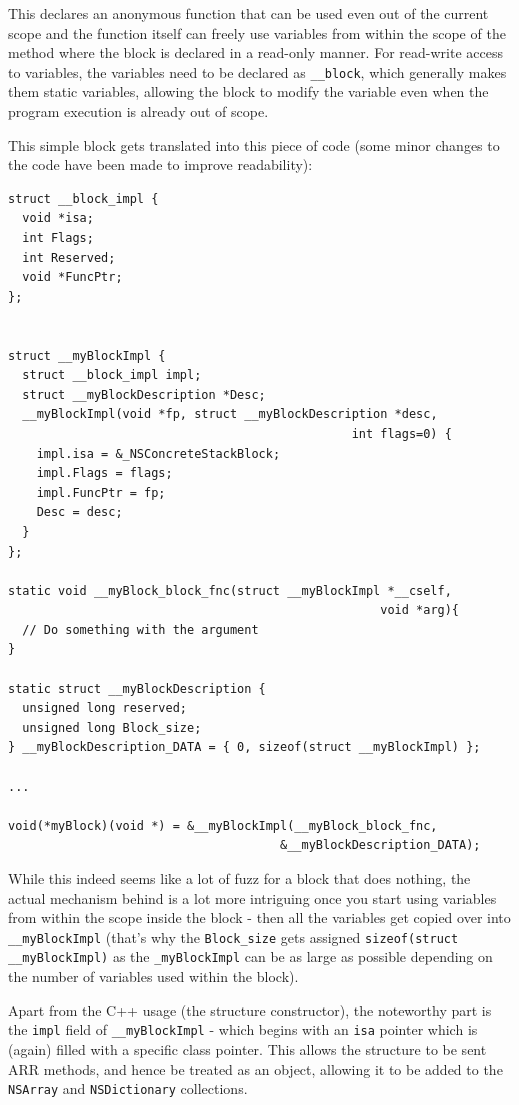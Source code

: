 This declares an anonymous function that can be used even out of the current scope and the function itself can freely use variables from within the scope of the method where the block is declared in a read-only manner. For read-write access to variables, the variables need to be declared as \verb=__block=, which generally makes them static variables, allowing the block to modify the variable even when the program execution is already out of scope.

This simple block gets translated into this piece of code (some minor changes to the code have been made to improve readability):

\begin{verbatim}
struct __block_impl {
  void *isa;
  int Flags;
  int Reserved;
  void *FuncPtr;
};


struct __myBlockImpl {
  struct __block_impl impl;
  struct __myBlockDescription *Desc;
  __myBlockImpl(void *fp, struct __myBlockDescription *desc, 
                                                int flags=0) {
    impl.isa = &_NSConcreteStackBlock;
    impl.Flags = flags;
    impl.FuncPtr = fp;
    Desc = desc;
  }
};

static void __myBlock_block_fnc(struct __myBlockImpl *__cself, 
                                                    void *arg){
  // Do something with the argument
}

static struct __myBlockDescription {
  unsigned long reserved;
  unsigned long Block_size;
} __myBlockDescription_DATA = { 0, sizeof(struct __myBlockImpl) };

...

void(*myBlock)(void *) = &__myBlockImpl(__myBlock_block_fnc, 
                                      &__myBlockDescription_DATA);

\end{verbatim}

While this indeed seems like a lot of fuzz for a block that does nothing, the actual mechanism behind is a lot more intriguing once you start using variables from within the scope inside the block - then all the variables get copied over into \verb=__myBlockImpl= (that's why the \verb=Block_size= gets assigned \verb=sizeof(=\verb=struct= \verb=__myBlockImpl)= as the \verb=_myBlockImpl= can be as large as possible depending on the number of variables used within the block).

Apart from the C++ usage (the structure constructor), the noteworthy part is the \verb=impl= field of \verb=__myBlockImpl= - which begins with an \verb=isa= pointer which is (again) filled with a specific class pointer. This allows the structure to be sent ARR methods, and hence be treated as an object, allowing it to be added to the \verb=NSArray= and \verb=NSDictionary= collections.
